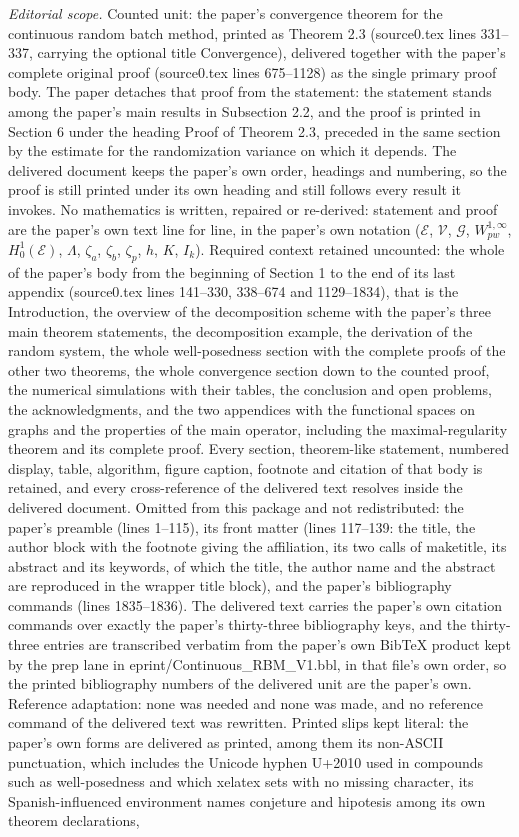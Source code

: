\documentclass[10pt,a4paper]{amsart}
\begin{document}
\noindent\textit{Editorial scope.} Counted unit: the paper's convergence theorem for the continuous random batch method, printed as Theorem 2.3 (source0.tex lines 331--337, carrying the optional title Convergence), delivered together with the paper's complete original proof (source0.tex lines 675--1128) as the single primary proof body. The paper detaches that proof from the statement: the statement stands among the paper's main results in Subsection 2.2, and the proof is printed in Section 6 under the heading Proof of Theorem 2.3, preceded in the same section by the estimate for the randomization variance on which it depends. The delivered document keeps the paper's own order, headings and numbering, so the proof is still printed under its own heading and still follows every result it invokes. No mathematics is written, repaired or re-derived: statement and proof are the paper's own text line for line, in the paper's own notation ($\mathcal{E}$, $\mathcal{V}$, $\mathcal{G}$, $W^{1,\infty}_{pw}$, $H^1_0(\mathcal{E})$, $\Lambda$, $\zeta_a$, $\zeta_b$, $\zeta_p$, $h$, $K$, $I_k$). Required context retained uncounted: the whole of the paper's body from the beginning of Section 1 to the end of its last appendix (source0.tex lines 141--330, 338--674 and 1129--1834), that is the Introduction, the overview of the decomposition scheme with the paper's three main theorem statements, the decomposition example, the derivation of the random system, the whole well-posedness section with the complete proofs of the other two theorems, the whole convergence section down to the counted proof, the numerical simulations with their tables, the conclusion and open problems, the acknowledgments, and the two appendices with the functional spaces on graphs and the properties of the main operator, including the maximal-regularity theorem and its complete proof. Every section, theorem-like statement, numbered display, table, algorithm, figure caption, footnote and citation of that body is retained, and every cross-reference of the delivered text resolves inside the delivered document. Omitted from this package and not redistributed: the paper's preamble (lines 1--115), its front matter (lines 117--139: the title, the author block with the footnote giving the affiliation, its two calls of maketitle, its abstract and its keywords, of which the title, the author name and the abstract are reproduced in the wrapper title block), and the paper's bibliography commands (lines 1835--1836). The delivered text carries the paper's own citation commands over exactly the paper's thirty-three bibliography keys, and the thirty-three entries are transcribed verbatim from the paper's own BibTeX product kept by the prep lane in eprint/Continuous\_RBM\_V1.bbl, in that file's own order, so the printed bibliography numbers of the delivered unit are the paper's own. Reference adaptation: none was needed and none was made, and no reference command of the delivered text was rewritten. Printed slips kept literal: the paper's own forms are delivered as printed, among them its non-ASCII punctuation, which includes the Unicode hyphen U+2010 used in compounds such as well-posedness and which xelatex sets with no missing character, its Spanish-influenced environment names conjeture and hipotesis among its own theorem declarations, 
\end{document}
